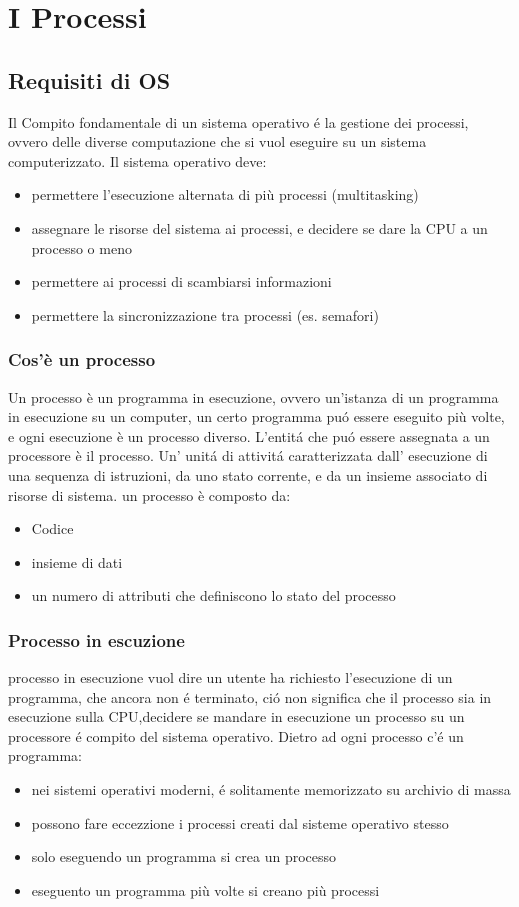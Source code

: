 \section{I Processi}
\subsection{Requisiti di OS}
Il  Compito fondamentale di un sistema operativo é la gestione dei processi, ovvero delle diverse computazione che si vuol
eseguire su un sistema computerizzato. Il sistema operativo deve:
\begin{itemize}
    \item permettere l'esecuzione alternata di più processi (multitasking)
    \item assegnare le risorse del sistema ai processi, e decidere se dare la CPU a un processo o meno
    \item permettere ai processi di scambiarsi informazioni
    \item permettere la sincronizzazione tra processi (es. semafori)
\end{itemize}
\subsubsection{Cos'è un processo}
Un processo è un programma in esecuzione, ovvero un'istanza di un programma in esecuzione su un computer, un certo programma
puó essere eseguito più volte, e ogni esecuzione è un processo diverso.
L'entitá che puó essere assegnata a un processore è il processo.
Un' unitá di attivitá caratterizzata dall' esecuzione di una sequenza di istruzioni, da uno stato corrente, e da un insieme
associato di risorse di sistema.
un processo è composto da:
\begin{itemize}
    \item Codice
    \item insieme di dati
    \item un numero di attributi che definiscono lo stato del processo
    \end{itemize}
\subsubsection{Processo in escuzione}
processo in esecuzione vuol dire un utente ha richiesto l'esecuzione di un programma, che ancora non é terminato,
ció non significa che il processo sia in esecuzione sulla CPU,decidere se mandare in esecuzione un processo su un
processore é compito del sistema operativo.
Dietro ad ogni processo c'é un programma:
\begin{itemize}
    \item nei sistemi operativi moderni, é solitamente memorizzato su archivio di massa
    \item possono fare eccezzione i processi creati dal sisteme operativo stesso
    \item solo eseguendo un programma si crea un processo
    \item eseguento un programma più volte si creano più processi
\end{itemize}
